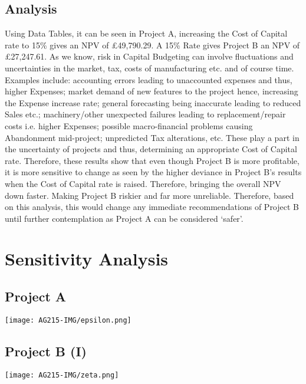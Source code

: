 \documentclass[11pt, english]{article}
\begin{document}
	\subsection{Analysis}

	Using Data Tables, it can be seen in Project A, increasing the Cost of Capital rate to 15\% gives an NPV of £49,790.29. A 15\% Rate gives Project B an NPV of \pounds27,247.61. As we know, risk in Capital Budgeting can involve fluctuations and uncertainties in the market, tax, costs of manufacturing etc. and of course time. Examples include: accounting errors leading to unaccounted expenses and thus, higher Expenses; market demand of new features to the project hence, increasing the Expense increase rate; general forecasting being inaccurate leading to reduced Sales etc.; machinery/other unexpected failures leading to replacement/repair costs i.e. higher Expenses; possible macro-financial problems causing Abandonment mid-project; unpredicted Tax alterations, etc. These play a part in the uncertainty of projects and thus, determining an appropriate Cost of Capital rate. Therefore, these results show that even though Project B is more profitable, it is more sensitive to change as seen by the higher deviance in Project B’s results when the Cost of Capital rate is raised. Therefore, bringing the overall NPV down faster. Making Project B riskier and far more unreliable. Therefore, based on this analysis, this would change any immediate recommendations of Project B until further contemplation as Project A can be considered `safer'.

\newpage

\section{Sensitivity Analysis}	

	\subsection{Project A}

	\begin{center}
                \texttt{[image: AG215-IMG/epsilon.png]}
        \end{center}

	\subsection{Project B (I)}

	\begin{center}
                \texttt{[image: AG215-IMG/zeta.png]}
        \end{center} 
\end{document}
